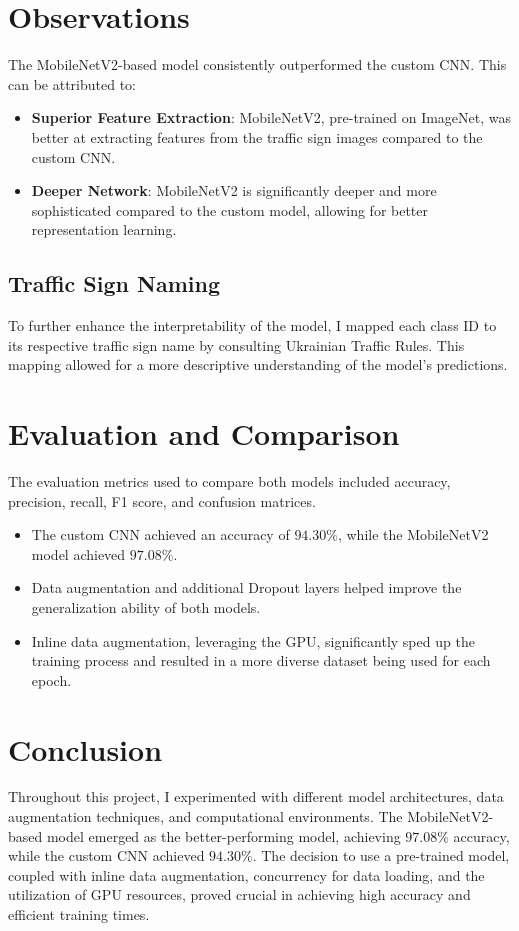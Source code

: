 \documentclass[11pt]{article}
\begin{document}
\section{Observations}
The MobileNetV2-based model consistently outperformed the custom CNN. This can be attributed to:
\begin{itemize}
    \item \textbf{Superior Feature Extraction}: MobileNetV2, pre-trained on ImageNet, was better at extracting features from the traffic sign images compared to the custom CNN.
    \item \textbf{Deeper Network}: MobileNetV2 is significantly deeper and more sophisticated compared to the custom model, allowing for better representation learning.
\end{itemize}

\subsection{Traffic Sign Naming}
To further enhance the interpretability of the model, I mapped each class ID to its respective traffic sign name by consulting Ukrainian Traffic Rules. This mapping allowed for a more descriptive understanding of the model's predictions.

\section{Evaluation and Comparison}
The evaluation metrics used to compare both models included accuracy, precision, recall, F1 score, and confusion matrices.
\begin{itemize}
    \item The custom CNN achieved an accuracy of $94.30\%$, while the MobileNetV2 model achieved $97.08\%$.
    \item Data augmentation and additional Dropout layers helped improve the generalization ability of both models.
    \item Inline data augmentation, leveraging the GPU, significantly sped up the training process and resulted in a more diverse dataset being used for each epoch.
\end{itemize}

\section{Conclusion}
Throughout this project, I experimented with different model architectures, data augmentation techniques, and computational environments. The MobileNetV2-based model emerged as the better-performing model, achieving $97.08\%$ accuracy, while the custom CNN achieved $94.30\%$. The decision to use a pre-trained model, coupled with inline data augmentation, concurrency for data loading, and the utilization of GPU resources, proved crucial in achieving high accuracy and efficient training times.
\end{document}
